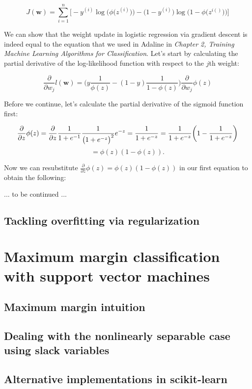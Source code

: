 \documentclass{report}
\begin{document}
\[
J(\mathbf{w}) = \sum_{i=1}^{n} \Bigg[- y^{(i)} \log \bigg(\phi \big( z^{(i)} \big) \bigg) - \bigg(1 - y^{(i)} \bigg) \log \bigg( 1 - \phi \big( z^{i()} \big) \bigg)  \Bigg]
\]

We can show that the weight update in logistic regression via gradient descent is indeed equal to the equation that we used in Adaline in \textit{Chapter 2, Training Machine Learning Algorithms for Classification}. Let's start by calculating the partial derivative of the log-likelihood function with respect to the $j$th weight:

\[
\frac{\partial}{\partial w_j} l(\mathbf{w}) = \Bigg( y \frac{1}{\phi(z)}  - (1-y) \frac{1}{1-\phi(z)}   \Bigg)   \frac{\partial}{\partial w_j} \phi(z)
\]

Before we continue, let's calculate the partial derivative of the sigmoid function  first:

\[
\frac{\partial}{\partial z} \phi(z) = \frac{\partial}{\partial z} \frac{1}{1 + e^{-1}} \frac{1}{\big( 1 + e^{-z}\big)^2} e^{-z} = \frac{1}{1 + e^{-z}} = \frac{1}{1 + e^{-z}} \bigg( 1 - \frac{1}{1 + e^{-z}} \bigg) \\\\
\]
\[
= \phi(z)(1-\phi(z)).
\]

Now we can resubstitute $\frac{\partial}{\partial z} \phi(z) = \phi(z)(1-\phi(z))$ in our first equation to obtain the following:


\newpage

... to be continued ... 

\newpage

\subsection{Tackling overfitting via regularization}
\section{Maximum margin classification with support vector machines}
\subsection{Maximum margin intuition}
\subsection{Dealing with the nonlinearly separable case using slack variables}
\subsection{Alternative implementations in scikit-learn}
\end{document}
